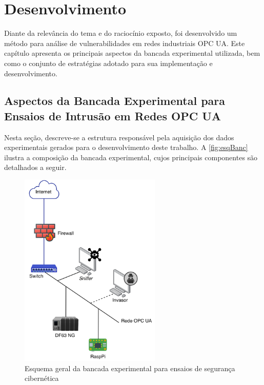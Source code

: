 \chapter{Desenvolvimento} \label{cap:desenvolvimento}

Diante da relevância do tema e do raciocínio exposto, foi desenvolvido um método para análise de  vulnerabilidades em redes industriais  OPC UA. Este capítulo apresenta os principais aspectos da bancada experimental utilizada, bem como o conjunto de estratégias adotado para sua implementação e desenvolvimento.

\section{Aspectos da Bancada Experimental para Ensaios de Intrusão em Redes OPC UA}

    Nesta seção, descreve-se a estrutura responsável pela aquisição dos dados experimentais gerados para o desenvolvimento deste trabalho. A \autoref{fig:esqBanc} ilustra a composição da bancada experimental, cujos principais componentes são detalhados a seguir.

    \begin{figure}[htbp]
        \caption{\label{fig:esqBanc}Esquema geral da bancada experimental para ensaios de segurança cibernética}
        \begin{center}
            \includegraphics[width=0.6\textwidth]{USPSC-img/bancada.png}
        \end{center}
    \end{figure}

